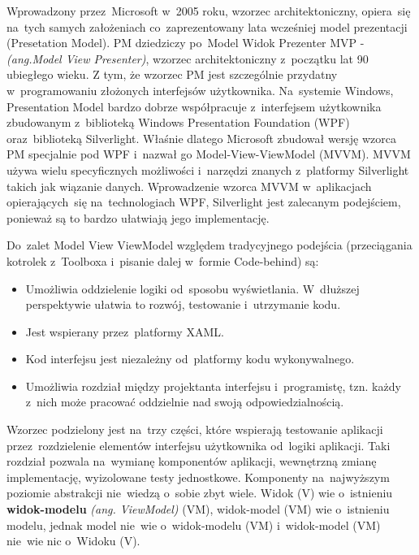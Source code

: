 \documentclass[a4paper,twoside,titlepage,openright]{book}
\begin{document}
Wprowadzony przez~Microsoft w~2005 roku, wzorzec architektoniczny, opiera~się na~tych samych założeniach co~zaprezentowany lata wcześniej model prezentacji (Presetation Model). PM dziedziczy po~Model Widok Prezenter MVP - \textit{(ang.Model View Presenter)}, wzorzec architektoniczny z~początku lat 90 ubiegłego wieku. Z tym, że wzorzec PM jest szczególnie przydatny w~programowaniu złożonych interfejsów użytkownika. Na~systemie Windows, Presentation Model bardzo dobrze współpracuje z~interfejsem użytkownika zbudowanym z~biblioteką Windows Presentation Foundation (WPF) oraz~biblioteką Silverlight. Właśnie dlatego Microsoft zbudował wersję wzorca PM specjalnie pod WPF i~nazwał go Model-View-ViewModel (MVVM). \cite{aspNet} MVVM używa wielu specyficznych możliwości i~narzędzi znanych z~platformy Silverlight takich jak wiązanie danych. Wprowadzenie wzorca MVVM w~aplikacjach opierających~się na~technologiach WPF, Silverlight jest zalecanym podejściem, ponieważ są to bardzo ułatwiają jego implementację.

Do~zalet Model View ViewModel względem tradycyjnego podejścia (przeciągania kotrolek z~Toolboxa i~pisanie dalej w~formie Code-behind) są:

\begin{itemize}

	\item Umożliwia oddzielenie logiki od~sposobu wyświetlania. W~dłuższej perspektywie ułatwia to rozwój, testowanie i~utrzymanie kodu.
	\item Jest wspierany przez~platformy XAML.
	\item Kod interfejsu jest niezależny od~platformy kodu wykonywalnego.
	\item Umożliwia rozdział między projektanta interfejsu i~programistę, tzn. każdy z~nich może pracować oddzielnie nad swoją odpowiedzialnością.
\end{itemize}

Wzorzec podzielony jest na~trzy części, które wspierają testowanie aplikacji przez~rozdzielenie elementów interfejsu użytkownika od~logiki aplikacji. Taki rozdział pozwala na~wymianę komponentów aplikacji, wewnętrzną zmianę implementację, wyizolowane testy jednostkowe. Komponenty na~najwyższym poziomie abstrakcji nie~wiedzą o~sobie zbyt wiele. Widok (V) wie o~istnieniu \textbf{widok-modelu} \textit{(ang. ViewModel)} (VM), widok-model (VM) wie o~istnieniu modelu, jednak model nie~wie o~widok-modelu (VM) i~widok-model (VM) nie~wie nic o~Widoku (V).
\end{document}
